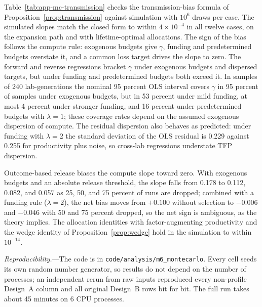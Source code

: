 Table~\ref{tab:app-mc-transmission} checks the transmission-bias formula of Proposition~\ref{prop:transmission}
against simulation with $10^6$ draws per case. The simulated slopes match the closed form to within
$4\times10^{-4}$ in all twelve cases, on the expansion path and with lifetime-optimal allocations. The sign of the
bias follows the compute rule: exogenous budgets give $\gamma$, funding and predetermined budgets overstate it,
and a common loss target drives the slope to zero. The forward and reverse regressions bracket $\gamma$ under
exogenous budgets and dispersed targets, but under funding and predetermined budgets both exceed it. In samples of
240 lab-generations the nominal 95 percent OLS interval covers $\gamma$ in 95 percent of samples under exogenous
budgets, but in 53 percent under mild funding, at most 4 percent under stronger funding, and 16 percent under
predetermined budgets with $\lambda=1$; these coverage rates depend on the assumed exogenous dispersion of
compute. The residual dispersion also behaves as predicted: under funding with $\lambda=2$ the standard deviation
of the OLS residual is 0.229 against 0.255 for productivity plus noise, so cross-lab regressions understate TFP
dispersion.

Outcome-based release biases the compute slope toward zero. With exogenous budgets and an absolute release
threshold, the slope falls from 0.178 to 0.112, 0.082, and 0.057 as 25, 50, and 75 percent of runs are dropped;
combined with a funding rule ($\lambda=2$), the net bias moves from $+0.100$ without selection to $-0.006$ and
$-0.046$ with 50 and 75 percent dropped, so the net sign is ambiguous, as the theory implies. The allocation identities with factor-augmenting
productivity and the wedge identity of Proposition~\ref{prop:wedge} hold in the simulation to within $10^{-14}$.



\emph{Reproducibility.}---The code is in \texttt{code/analysis/m6\_montecarlo}. Every cell seeds its own random
number generator, so results do not depend on the number of processes; an independent rerun from raw inputs
reproduced every non-profile Design~A column and all original Design~B rows bit for bit. The full run takes about
45 minutes on 6 CPU processes.
